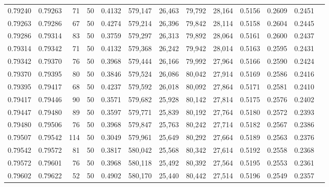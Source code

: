 \begin{tabular}{rrrrrrrrrrrrr}
0.79240 & 0.79263 &    71 &  50 &                                     0.4132 & 579,147 &  26,463 &  79,792 &  28,164 & 0.5156 & 0.2609 & 0.2451 \\
0.79263 & 0.79286 &    67 &  50 &                                     0.4274 & 579,214 &  26,396 &  79,842 &  28,114 & 0.5158 & 0.2604 & 0.2445 \\
0.79286 & 0.79314 &    83 &  50 &                                     0.3759 & 579,297 &  26,313 &  79,892 &  28,064 & 0.5161 & 0.2600 & 0.2437 \\
0.79314 & 0.79342 &    71 &  50 &                                     0.4132 & 579,368 &  26,242 &  79,942 &  28,014 & 0.5163 & 0.2595 & 0.2431 \\
0.79342 & 0.79370 &    76 &  50 &                                     0.3968 & 579,444 &  26,166 &  79,992 &  27,964 & 0.5166 & 0.2590 & 0.2424 \\
0.79370 & 0.79395 &    80 &  50 &                                     0.3846 & 579,524 &  26,086 &  80,042 &  27,914 & 0.5169 & 0.2586 & 0.2416 \\
0.79395 & 0.79417 &    68 &  50 &                                     0.4237 & 579,592 &  26,018 &  80,092 &  27,864 & 0.5171 & 0.2581 & 0.2410 \\
0.79417 & 0.79446 &    90 &  50 &                                     0.3571 & 579,682 &  25,928 &  80,142 &  27,814 & 0.5175 & 0.2576 & 0.2402 \\
0.79447 & 0.79480 &    89 &  50 &                                     0.3597 & 579,771 &  25,839 &  80,192 &  27,764 & 0.5180 & 0.2572 & 0.2393 \\
0.79480 & 0.79506 &    76 &  50 &                                     0.3968 & 579,847 &  25,763 &  80,242 &  27,714 & 0.5182 & 0.2567 & 0.2386 \\
0.79507 & 0.79542 &   114 &  50 &                                     0.3049 & 579,961 &  25,649 &  80,292 &  27,664 & 0.5189 & 0.2563 & 0.2376 \\
0.79542 & 0.79572 &    81 &  50 &                                     0.3817 & 580,042 &  25,568 &  80,342 &  27,614 & 0.5192 & 0.2558 & 0.2368 \\
0.79572 & 0.79601 &    76 &  50 &                                     0.3968 & 580,118 &  25,492 &  80,392 &  27,564 & 0.5195 & 0.2553 & 0.2361 \\
0.79602 & 0.79622 &    52 &  50 &                                     0.4902 & 580,170 &  25,440 &  80,442 &  27,514 & 0.5196 & 0.2549 & 0.2357 \\

\end{tabular}
